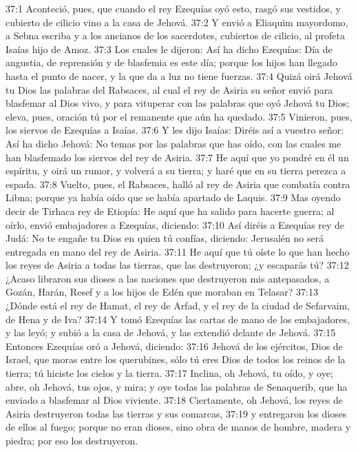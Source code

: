 37:1 Aconteció, pues, que cuando el rey Ezequías oyó esto, rasgó sus vestidos, y cubierto de cilicio vino a la casa de Jehová.  
37:2 Y envió a Eliaquim mayordomo, a Sebna escriba y a los ancianos de los sacerdotes, cubiertos de cilicio, al profeta Isaías hijo de Amoz.  
37:3 Los cuales le dijeron: Así ha dicho Ezequías: Día de angustia, de reprensión y de blasfemia es este día; porque los hijos han llegado hasta el punto de nacer, y la que da a luz no tiene fuerzas.  
37:4 Quizá oirá Jehová tu Dios las palabras del Rabsaces, al cual el rey de Asiria su señor envió para blasfemar al Dios vivo, y para vituperar con las palabras que oyó Jehová tu Dios; eleva, pues, oración tú por el remanente que aún ha quedado.  
37:5 Vinieron, pues, los siervos de Ezequías a Isaías.  
37:6 Y les dijo Isaías: Diréis así a vuestro señor: Así ha dicho Jehová: No temas por las palabras que has oído, con las cuales me han blasfemado los siervos del rey de Asiria.  
37:7 He aquí que yo pondré en él un espíritu, y oirá un rumor, y volverá a su tierra; y haré que en su tierra perezca a espada.  
37:8 Vuelto, pues, el Rabsaces, halló al rey de Asiria que combatía contra Libna; porque ya había oído que se había apartado de Laquis.  
37:9 Mas oyendo decir de Tirhaca rey de Etiopía: He aquí que ha salido para hacerte guerra; al oírlo, envió embajadores a Ezequías, diciendo:  
37:10 Así diréis a Ezequías rey de Judá: No te engañe tu Dios en quien tú confías, diciendo: Jerusalén no será entregada en mano del rey de Asiria.  
37:11 He aquí que tú oíste lo que han hecho los reyes de Asiria a todas las tierras, que las destruyeron; ¿y escaparás tú?  
37:12 ¿Acaso libraron sus dioses a las naciones que destruyeron mis antepasados, a Gozán, Harán, Resef y a los hijos de Edén que moraban en Telasar?  
37:13 ¿Dónde está el rey de Hamat, el rey de Arfad, y el rey de la ciudad de Sefarvaim, de Hena y de Iva?  
37:14 Y tomó Ezequías las cartas de mano de los embajadores, y las leyó; y subió a la casa de Jehová, y las extendió delante de Jehová. 
37:15 Entonces Ezequías oró a Jehová, diciendo:  
37:16 Jehová de los ejércitos, Dios de Israel, que moras entre los querubines, sólo tú eres Dios de todos los reinos de la tierra; tú hiciste los cielos y la tierra.  
37:17 Inclina, oh Jehová, tu oído, y oye; abre, oh Jehová, tus ojos, y mira; y oye todas las palabras de Senaquerib, que ha enviado a blasfemar al Dios viviente.  
37:18 Ciertamente, oh Jehová, los reyes de Asiria destruyeron todas las tierras y sus comarcas,  
37:19 y entregaron los dioses de ellos al fuego; porque no eran dioses, sino obra de manos de hombre, madera y piedra; por eso los destruyeron. 
